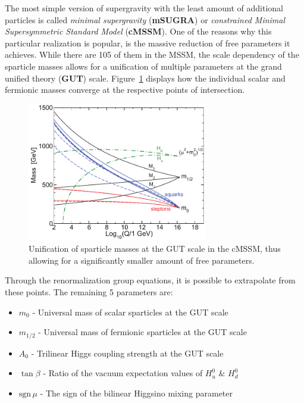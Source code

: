The most simple version of supergravity with the least amount of additional particles is called \textit{minimal supergravity} (\textbf{mSUGRA}) or \textit{constrained Minimal Supersymmetric Standard Model} (\textbf{cMSSM}). One of the reasons why this particular realization is popular, is the massive reduction of free parameters it achieves. While there are 105 of them in the MSSM, the scale dependency of the sparticle masses allows for a unification of multiple parameters at the grand unified theory (\textbf{GUT}) scale. Figure~\ref{fig:msugrarge} displays how the individual scalar and fermionic masses converge at the respective points of intersection.

\begin{figure}[ht!]
  \centering
  \includegraphics[width=0.7\textwidth]{plots/msugrarge.pdf}
  \caption{Unification of sparticle masses at the GUT scale in the cMSSM, thus allowing for a significantly smaller amount of free parameters.}
  \label{fig:msugrarge}
\end{figure}

\noindent Through the renormalization group equations, it is possible to extrapolate from these points. The remaining 5 parameters are:

\begin{itemize}
\item $m_0$ - Universal mass of scalar sparticles at the GUT scale
\item $m_{1/2}$ - Universal mass of fermionic sparticles at the GUT scale
\item $A_0$ - Trilinear Higgs coupling strength at the GUT scale
\item $\tan{\beta}$ - Ratio of the vacuum expectation values of $H^0_u$ \& $H^0_d$
\item $\text{sgn}\,\mu$ - The sign of the bilinear Higgsino mixing parameter
\end{itemize}

